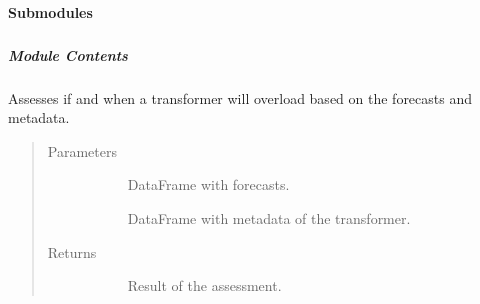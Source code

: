 \documentclass[letterpaper,10pt,english]{sphinxmanual}
\begin{document}
\paragraph{Submodules}
\label{\detokenize{autoapi/src/forecast/index:submodules}}

\subparagraph{}
\label{\detokenize{autoapi/src/forecast/assess/index:module-src.forecast.assess}}\label{\detokenize{autoapi/src/forecast/assess/index:src-forecast-assess}}\label{\detokenize{autoapi/src/forecast/assess/index::doc}}

\subparagraph{Module Contents}
\label{\detokenize{autoapi/src/forecast/assess/index:module-contents}}

\begin{fulllineitems}
\label{\detokenize{autoapi/src/forecast/assess/index:src.forecast.assess.logger}}
\end{fulllineitems}


\begin{fulllineitems}
\label{\detokenize{autoapi/src/forecast/assess/index:src.forecast.assess.asses_forecasts}}
Assesses if and when a transformer will overload based on the forecasts and metadata.
\begin{quote}\begin{description}
\item[{Parameters}] \leavevmode\begin{description}
\item[{}] \leavevmode
DataFrame with forecasts.

\item[{}] \leavevmode
DataFrame with metadata of the transformer.

\end{description}

\item[{Returns}] \leavevmode\begin{description}
\item[{}] \leavevmode
Result of the assessment.

\end{description}

\end{description}\end{quote}

\end{fulllineitems}
\end{document}

